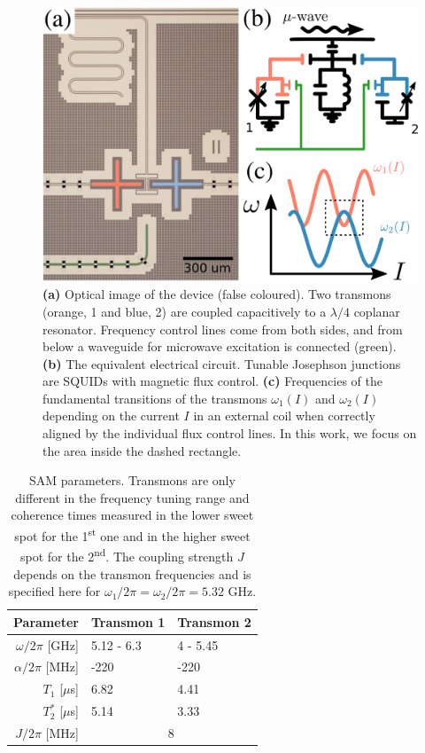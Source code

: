 \documentclass[%
 pra,
 amsmath,amssymb,
 reprint,%
]{revtex4-1}
\begin{document}
\begin{figure}
	 	\includegraphics[width=\linewidth]{experiment_2}
	\caption{\textbf{(a)} Optical image of 
	the device (false coloured). Two transmons 
	(orange, 1 and blue, 2) are coupled 
	capacitively to a $\lambda/4$ coplanar 
	resonator. Frequency control lines come from 
	both sides, and from below a waveguide for 
	microwave excitation  is connected (green). 
	\textbf{(b)} The equivalent electrical 
	circuit. Tunable Josephson junctions are 
	SQUIDs with magnetic flux control. 
	\textbf{(c)} Frequencies of the fundamental 
	transitions of the transmons $\omega_1(I)$ 
	and $\omega_2(I)$ depending on the current 
	$I$ in an external coil when correctly 
	aligned by the individual flux control lines. 
	In this work, we focus on the area inside the 
	dashed rectangle.}
	\label{fig:experiment}
\end{figure}


\begin{table}
	\begin{ruledtabular}
	\begin{tabular}{rll}
	Parameter & Transmon 1  & Transmon 2\\\hline
	$\omega/2\pi$ [GHz] & 5.12 - 6.3  & 4 - 5.45\\
	$\alpha/2\pi$ [MHz] & -220 & -220 \\
	$T_1$ [$\mu$s]  & 6.82 &  4.41 \\
	$T_2^*$ [$\mu$s]  & 5.14  &  3.33\\\hline
	$J/2\pi$ [MHz] &\multicolumn{2}{c}{8} 
	\end{tabular}
	\end{ruledtabular}
	\caption{SAM parameters. Transmons are only 
	different in the frequency tuning range and 
	coherence times measured in the lower sweet 
	spot for the 1\textsuperscript{st} one and in 
	the higher sweet spot for the 
	2\textsuperscript{nd}. The coupling strength 
	$J$ depends on the transmon frequencies and 
	is specified here for $\omega_1/2\pi = 
	\omega_2/2\pi = 5.32$ GHz.}
	\label{tab:parameters}
\end{table}
\end{document}
